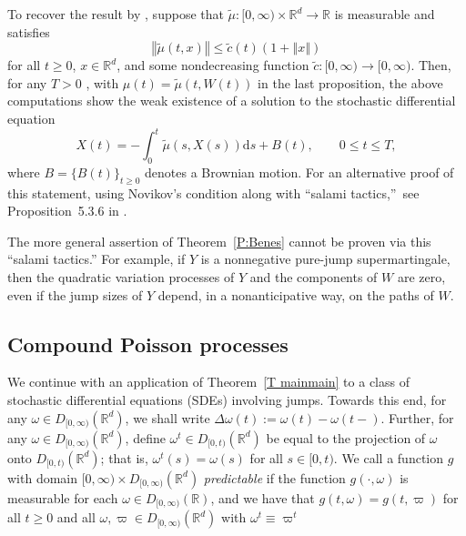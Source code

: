 To recover the result by \citet{Benes_1971}, suppose that $\widetilde{\mu }%
:[0,\infty )\times \mathbb{R}^{d}\rightarrow \mathbb{R}$ is measurable and
satisfies%
\begin{equation*}
\left\Vert \widetilde{\mu }\left( t,x\right) \right\Vert \leq \widetilde{c}%
(t)\left( 1+\left\Vert x\right\Vert \right)
\end{equation*}%
for all $t\geq 0$, $x \in {\mathbb{R}}^d$, and some nondecreasing function $%
\widetilde{c}:[0,\infty )\rightarrow \lbrack 0,\infty )$. Then, for any $T>0$%
, with $\mu (t)=\widetilde{\mu }(t,W(t))$ in the last proposition, the above
computations show the weak existence of a solution to the stochastic
differential equation
\begin{equation*}
X(t)=-\int_{0}^{t}\widetilde{\mu }\left( s,X(s)\right) \mathrm{d}%
s+B(t),\qquad 0\leq t\leq T,
\end{equation*}%
where $B=\{B(t)\}_{t\geq 0}$ denotes a Brownian motion. For an alternative
proof of this statement, using Novikov's condition along with
\textquotedblleft salami tactics,\textquotedblright\ see Proposition~5.3.6
in \citet{KS1}.

The more general assertion of Theorem~\ref{P:Benes} cannot be proven via
this ``salami tactics.'' For example, if $Y$ is a nonnegative pure-jump
supermartingale, then the quadratic variation processes of $Y$ and the
components of $W$ are zero, even if the jump sizes of $Y$ depend, in a
nonanticipative way, on the paths of $W$.

\subsection{Compound Poisson processes}

We continue with an application of Theorem~\ref{T mainmain} to a class of
stochastic differential equations (SDEs) involving jumps. %
Towards this end, for any $\omega \in D_{[0,\infty )}({\mathbb{R}}^{d})$, we
shall write $\Delta \omega (t):=\omega (t)-\omega (t-)$. Further, for any $%
\omega \in D_{[0,\infty )}({\mathbb{R}}^{d})$, define $\omega ^{t}\in
D_{[0,t)}({\mathbb{R}}^{d})$ be equal to the projection of $\omega $ onto $%
D_{[0,t)}\left( {\mathbb{R}}^{d}\right) $; that is, $\omega ^{t}\left(
s\right) =\omega \left( s\right) $ for all $s\in \lbrack 0,t)$. We call a
function $g$ with domain $[0,\infty )\times D_{[0,\infty )}({\mathbb{R}}%
^{d}) $ \emph{predictable} if the function $g\left( \cdot ,\omega \right) $
is measurable for each $\omega \in D_{[0,\infty )}({\mathbb{R}})$, and we
have that $g(t,\omega )=g(t,\varpi )$ for all $t\geq 0$ and all $\omega
,\varpi \in D_{[0,\infty )}({\mathbb{R}}^{d})$ with $\omega ^{t}\equiv
\varpi ^{t}$

